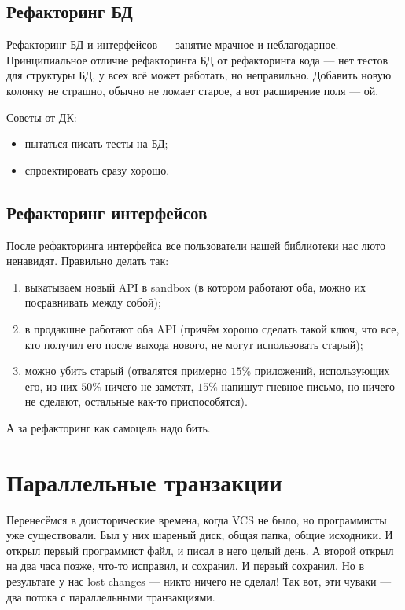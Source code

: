\documentclass[11pt,a4paper]{article}
\begin{document}
\subsection{Рефакторинг БД}
Рефакторинг БД и интерфейсов — занятие мрачное и неблагодарное. Принципиальное отличие рефакторинга БД от рефакторинга кода — нет тестов для структуры БД, у всех всё может работать, но неправильно. Добавить новую колонку не страшно, обычно не ломает старое, а вот расширение поля — ой.

Советы от ДК:
\begin{itemize}
\item пытаться писать тесты на БД;
\item спроектировать сразу хорошо.
\end{itemize}

\subsection{Рефакторинг интерфейсов}
После рефакторинга интерфейса все пользователи нашей библиотеки нас люто ненавидят. Правильно делать так: 

\begin{enumerate}
\item выкатываем новый API в sandbox (в котором работают оба, можно их посравнивать между собой);
\item в продакшне работают оба API (причём хорошо сделать такой ключ, что все, кто получил его после выхода нового, не могут использовать старый);
\item можно убить старый (отвалятся примерно $15\%$ приложений, использующих его, из них $50\%$ ничего не заметят, $15\%$ напишут гневное письмо, но ничего не сделают, остальные как-то приспособятся).
\end{enumerate}

А за рефакторинг как самоцель надо бить.

\section{Параллельные транзакции}
Перенесёмся в доисторические времена, когда VCS не было, но программисты уже существовали. Был у них шареный диск, общая папка, общие исходники. И открыл первый программист файл, и писал в него целый день. А второй открыл на два часа позже, что-то исправил, и сохранил. И первый сохранил. Но в результате у нас lost changes — никто ничего не сделал! Так вот, эти чуваки — два потока с параллельными транзакциями.
\end{document}
